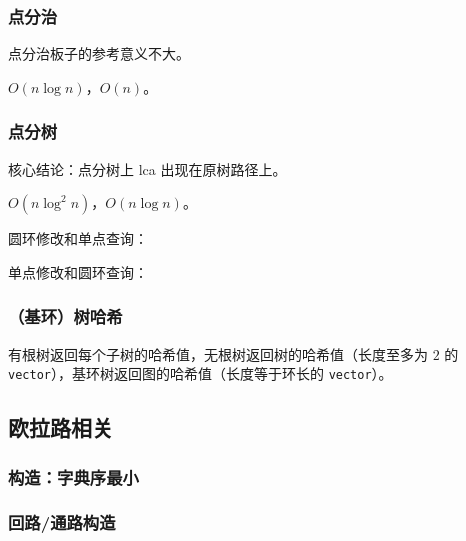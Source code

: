 \documentclass[12pt]{ctexart}
\begin{document}


\subsubsection{点分治}

点分治板子的参考意义不大。

$O(n\log n)$，$O(n)$。



\subsubsection{点分树}

核心结论：点分树上 lca 出现在原树路径上。

$O(n\log^2 n)$，$O(n\log n)$。



圆环修改和单点查询：



单点修改和圆环查询：



\subsubsection{（基环）树哈希}

有根树返回每个子树的哈希值，无根树返回树的哈希值（长度至多为 $2$ 的 \verb|vector|），基环树返回图的哈希值（长度等于环长的 \verb|vector|）。



\subsection{欧拉路相关}

\subsubsection{构造：字典序最小}



\subsubsection{回路/通路构造}
\end{document}
